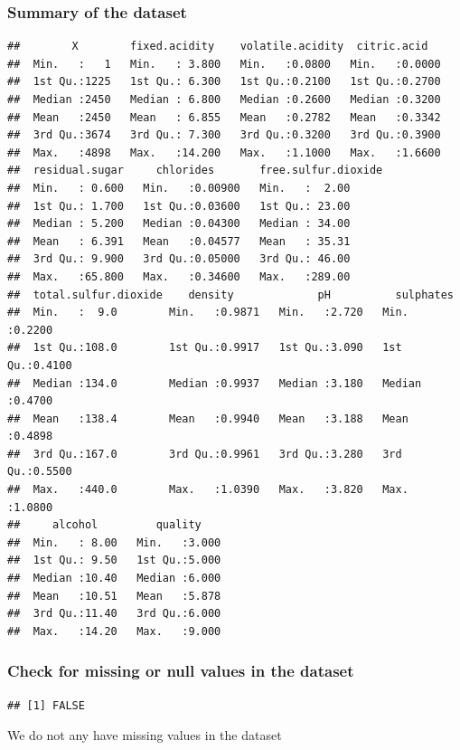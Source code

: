 \documentclass[]{article}
\begin{document}
\subsubsection{Summary of the dataset}\label{summary-of-the-dataset}

\begin{verbatim}
##        X        fixed.acidity    volatile.acidity  citric.acid    
##  Min.   :   1   Min.   : 3.800   Min.   :0.0800   Min.   :0.0000  
##  1st Qu.:1225   1st Qu.: 6.300   1st Qu.:0.2100   1st Qu.:0.2700  
##  Median :2450   Median : 6.800   Median :0.2600   Median :0.3200  
##  Mean   :2450   Mean   : 6.855   Mean   :0.2782   Mean   :0.3342  
##  3rd Qu.:3674   3rd Qu.: 7.300   3rd Qu.:0.3200   3rd Qu.:0.3900  
##  Max.   :4898   Max.   :14.200   Max.   :1.1000   Max.   :1.6600  
##  residual.sugar     chlorides       free.sulfur.dioxide
##  Min.   : 0.600   Min.   :0.00900   Min.   :  2.00     
##  1st Qu.: 1.700   1st Qu.:0.03600   1st Qu.: 23.00     
##  Median : 5.200   Median :0.04300   Median : 34.00     
##  Mean   : 6.391   Mean   :0.04577   Mean   : 35.31     
##  3rd Qu.: 9.900   3rd Qu.:0.05000   3rd Qu.: 46.00     
##  Max.   :65.800   Max.   :0.34600   Max.   :289.00     
##  total.sulfur.dioxide    density             pH          sulphates     
##  Min.   :  9.0        Min.   :0.9871   Min.   :2.720   Min.   :0.2200  
##  1st Qu.:108.0        1st Qu.:0.9917   1st Qu.:3.090   1st Qu.:0.4100  
##  Median :134.0        Median :0.9937   Median :3.180   Median :0.4700  
##  Mean   :138.4        Mean   :0.9940   Mean   :3.188   Mean   :0.4898  
##  3rd Qu.:167.0        3rd Qu.:0.9961   3rd Qu.:3.280   3rd Qu.:0.5500  
##  Max.   :440.0        Max.   :1.0390   Max.   :3.820   Max.   :1.0800  
##     alcohol         quality     
##  Min.   : 8.00   Min.   :3.000  
##  1st Qu.: 9.50   1st Qu.:5.000  
##  Median :10.40   Median :6.000  
##  Mean   :10.51   Mean   :5.878  
##  3rd Qu.:11.40   3rd Qu.:6.000  
##  Max.   :14.20   Max.   :9.000
\end{verbatim}

\subsubsection{Check for missing or null values in the
dataset}\label{check-for-missing-or-null-values-in-the-dataset}

\begin{verbatim}
## [1] FALSE
\end{verbatim}

We do not any have missing values in the dataset
\end{document}
